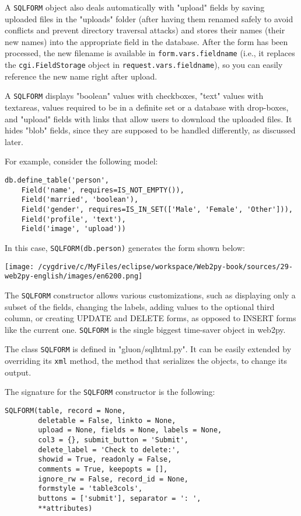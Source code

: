 \documentclass[justified,sixbynine,notoc]{tufte-book}
\def\ft{\small\tt}
\def\inxx#1{\index{#1}}
\begin{document}
\begin{fullwidth}
A {\ft SQLFORM} object also deals automatically with "upload" fields by saving uploaded files in the "uploads" folder (after having them renamed safely to avoid conflicts and prevent directory traversal attacks) and stores their names (their new names) into the appropriate field in the database. After the form has been processed, the new filename is available in {\ft form.vars.fieldname} (i.e., it replaces the {\ft cgi.FieldStorage} object in {\ft request.vars.fieldname}), so you can easily reference the new name right after upload.

A {\ft SQLFORM} displays "boolean" values with checkboxes, "text" values with textareas, values required to be in a definite set or a database with drop-boxes, and "upload" fields with links that allow users to download the uploaded files. It hides "blob" fields, since they are supposed to be handled differently, as discussed later.

For example, consider the following model:
\begin{lstlisting}
db.define_table('person',
    Field('name', requires=IS_NOT_EMPTY()),
    Field('married', 'boolean'),
    Field('gender', requires=IS_IN_SET(['Male', 'Female', 'Other'])),
    Field('profile', 'text'),
    Field('image', 'upload'))
\end{lstlisting}

In this case, {\ft SQLFORM(db.person)} generates the form shown below:


\goodbreak\begin{center}\texttt{[image: /cygdrive/c/MyFiles/eclipse/workspace/Web2py-book/sources/29-web2py-english/images/en6200.png]}\end{center}


The {\ft SQLFORM} constructor allows various customizations, such as displaying only a subset of the fields, changing the labels, adding values to the optional third column, or creating UPDATE and DELETE forms, as opposed to INSERT forms like the current one.
{\ft SQLFORM} is the single biggest time-saver object in web2py.

The class {\ft SQLFORM} is defined in "gluon/sqlhtml.py". It can be easily extended by overriding its {\ft xml} method, the method that serializes the objects, to change its output.

\inxx{fields} \inxx{labels}
The signature for the {\ft SQLFORM} constructor is the following:
\begin{lstlisting}
SQLFORM(table, record = None,
        deletable = False, linkto = None,
        upload = None, fields = None, labels = None,
        col3 = {}, submit_button = 'Submit',
        delete_label = 'Check to delete:',
        showid = True, readonly = False,
        comments = True, keepopts = [],
        ignore_rw = False, record_id = None,
        formstyle = 'table3cols',
        buttons = ['submit'], separator = ': ',
        **attributes)


\end{lstlisting}
\end{fullwidth}
\end{document}
